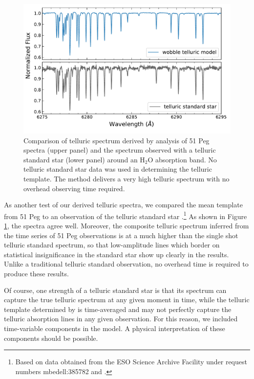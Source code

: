\documentclass[modern]{aastex62}
\begin{document}
\begin{figure}
\centering
\includegraphics[width=5in]{telluric_standard}
\caption{Comparison of telluric spectrum derived by \wobble analysis of 51 Peg spectra (upper panel) and the spectrum observed with a telluric standard star (lower panel) around an H$_2$O absorption band. No telluric standard star data was used in determining the \wobble telluric template. The \wobble method delivers a very high \SNR telluric spectrum with no overhead observing time required.}
\label{fig:telluric_standard}
\end{figure}

As another test of our derived telluric spectra, we compared the mean template from 51 Peg to an observation of the telluric standard star .\footnote{Based on data obtained from the ESO Science Archive Facility under request numbers mbedell:385782 and .}
As shown in Figure \ref{fig:telluric_standard}, the spectra agree well.
Moreover, the composite telluric spectrum inferred from the time series of 51 Peg observations is at a much higher \SNR than the single shot telluric standard spectrum, so that low-amplitude lines which border on statistical insignificance in the standard star show up clearly in the \wobble results.
Unlike a traditional telluric standard observation, no overhead time is required to produce these results.

Of course, one strength of a telluric standard star is that its spectrum can capture the true telluric spectrum at any given moment in time, while the telluric template determined by \wobble is time-averaged and may not perfectly capture the telluric absorption lines in any given observation.
For this reason, we included time-variable components in the model.
A physical interpretation of these components should be possible.
\end{document}
